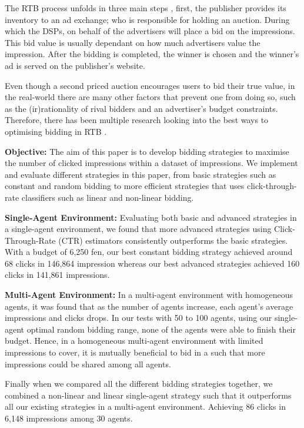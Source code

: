 \documentclass{sig-alternate-05-2015}
\begin{document}
The RTB process unfolds in three main steps \cite{yuan_meas_2013}, first, the publisher provides its inventory to an ad exchange; who is responsible for holding an auction. During which the DSPs, on behalf of the advertisers will place a bid on the impressions. This bid value is usually dependant on how much advertisers value the impression. After the bidding is completed, the winner is chosen and the winner's ad is served on the publisher's website. 

Even though a second priced auction encourages users to bid their true value, in the real-world there are many other factors that prevent one from doing so, such as the (ir)rationality of rival bidders and an advertiser's budget constraints. Therefore, there has been multiple research looking into the best ways to optimising bidding in RTB \cite{yuan_rev_2014, zhang_real-time_2014}.

\textbf{Objective:}
The aim of this paper is to develop bidding strategies to maximise the number of clicked impressions within a dataset of impressions. We implement and evaluate different strategies in this paper, from basic strategies such as constant and random bidding to more efficient strategies that uses click-through-rate classifiers such as linear and non-linear bidding.

\textbf{Single-Agent Environment:}
Evaluating both basic and advanced strategies in a single-agent environment, we found that more advanced strategies using Click-Through-Rate (CTR) estimators consistently outperforms the basic strategies. With a budget of 6,250 fen, our best constant bidding strategy achieved around 68 clicks in 146,864 impression whereas our best advanced strategies achieved 160 clicks in 141,861 impressions.

\textbf{Multi-Agent Environment:}
In a multi-agent environment with homogeneous agents, it was found that as the number of agents increase, each agent's average impressions and clicks drops. In our tests with 50 to 100 agents, using our single-agent optimal random bidding range, none of the agents were able to finish their budget. Hence, in a homogeneous multi-agent environment with limited impressions to cover, it is mutually beneficial to bid in a such that more impressions could be shared among all agents. 

Finally when we compared all the different bidding strategies together, we combined a non-linear and linear single-agent strategy such that it outperforms all our existing strategies in a multi-agent environment. Achieving 86 clicks in 6,148 impressions among 30 agents. 
\end{document}
